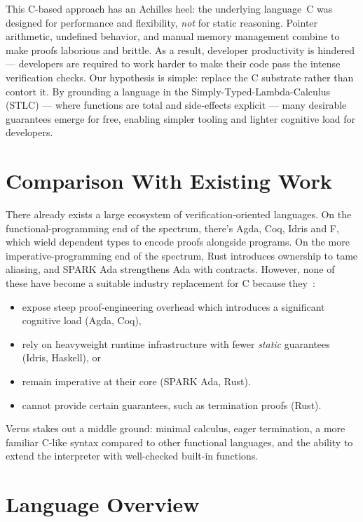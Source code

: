 \documentclass[conference]{IEEEtran}
\begin{document}
This C-based approach has an Achilles heel: the underlying language~C was designed for performance and flexibility, \emph{not} for static reasoning.  Pointer arithmetic, undefined behavior, and manual memory management combine to make proofs laborious and brittle. As a result, developer productivity is hindered --- developers are required to work harder to make their code pass the intense verification checks. Our hypothesis is simple: replace the C substrate rather than contort it.  By grounding a language in the Simply-Typed-Lambda-Calculus (STLC) --- where functions are total and side‑effects explicit --- many desirable guarantees emerge for free, enabling simpler tooling and lighter cognitive load for developers.

\section{Comparison With Existing Work}
There already exists a large ecosystem of verification‑oriented languages. On the functional-programming end of the spectrum, there's Agda, Coq, Idris and F\*, which wield dependent types to encode proofs alongside programs. On the more imperative-programming end of the spectrum, Rust introduces ownership to tame aliasing, and SPARK Ada strengthens Ada with contracts. However, none of these have become a suitable industry replacement for C because they~\cite{havelund2022}:

\begin{itemize}[nosep]
\item expose steep proof‑engineering overhead which introduces a significant cognitive load (Agda, Coq),
\item rely on heavyweight runtime infrastructure with fewer \emph{static} guarantees (Idris, Haskell), or
\item remain imperative at their core (SPARK Ada, Rust).
\item cannot provide certain guarantees, such as termination proofs (Rust).
\end{itemize}

Verus stakes out a middle ground: minimal calculus, eager termination, a more familiar C-like syntax compared to other functional languages, and the ability to extend the interpreter with well-checked built-in functions.

\section{Language Overview}
\end{document}
